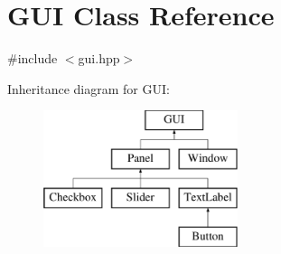 \hypertarget{class_g_u_i}{}\section{G\+UI Class Reference}
\label{class_g_u_i}


{\ttfamily \#include $<$gui.\+hpp$>$}

Inheritance diagram for G\+UI\+:\begin{figure}[H]
\begin{center}
\leavevmode
\includegraphics[height=4.000000cm]{class_g_u_i}
\end{center}
\end{figure}
